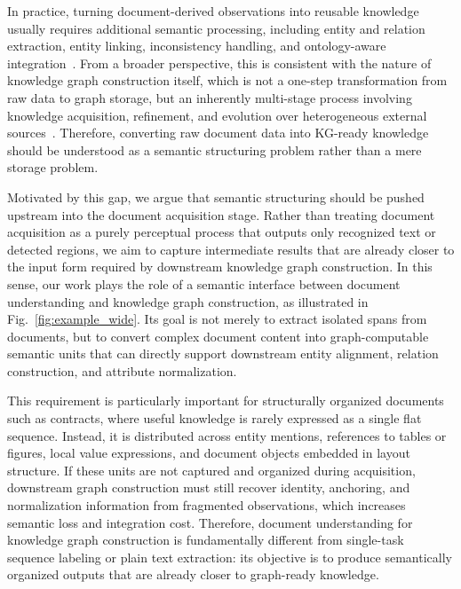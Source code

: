 \documentclass[pdflatex,twocolumn,iicol,sn-vancouver-num]{sn-jnl}%
\theoremstyle{thmstyleone}%
\theoremstyle{thmstyletwo}%
\theoremstyle{thmstylethree}%
\begin{document}
In practice, turning document-derived observations into reusable knowledge usually requires additional semantic processing, including entity and relation extraction, entity linking, inconsistency handling, and ontology-aware integration~\cite{salmanDocKGUnstructuredDocuments2024,sunDocs2KGUnifiedKnowledge2024,galianoT2KGTransformingMultimodal2023a}. From a broader perspective, this is consistent with the nature of knowledge graph construction itself, which is not a one-step transformation from raw data to graph storage, but an inherently multi-stage process involving knowledge acquisition, refinement, and evolution over heterogeneous external sources~\cite{zhongComprehensiveSurveyAutomatic2023,hoganKnowledgeGraphs2022a,paulheimAutomaticKnowledgeGraph}.
Therefore, converting raw document data into KG-ready knowledge should be understood as a semantic structuring problem rather than a mere storage problem.


Motivated by this gap, we argue that semantic structuring should be pushed upstream into the document acquisition stage. Rather than treating document acquisition as a purely perceptual process that outputs only recognized text or detected regions, we aim to capture intermediate results that are already closer to the input form required by downstream knowledge graph construction. In this sense, our work plays the role of a semantic interface between document understanding and knowledge graph construction, as illustrated in Fig.~\ref{fig:example_wide}. Its goal is not merely to extract isolated spans from documents, but to convert complex document content into graph-computable semantic units that can directly support downstream entity alignment, relation construction, and attribute normalization.

This requirement is particularly important for structurally organized documents such as contracts, where useful knowledge is rarely expressed as a single flat sequence. Instead, it is distributed across entity mentions, references to tables or figures, local value expressions, and document objects embedded in layout structure. If these units are not captured and organized during acquisition, downstream graph construction must still recover identity, anchoring, and normalization information from fragmented observations, which increases semantic loss and integration cost. Therefore, document understanding for knowledge graph construction is fundamentally different from single-task sequence labeling or plain text extraction: its objective is to produce semantically organized outputs that are already closer to graph-ready knowledge.
\end{document}
